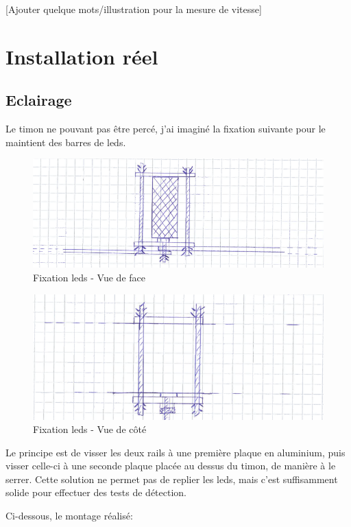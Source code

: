 [Ajouter quelque mots/illustration pour la mesure de vitesse]
\section{Installation réel}
\subsection{Eclairage}
Le timon ne pouvant pas être percé, j'ai imaginé la fixation suivante pour le maintient des barres de leds.

\begin{figure}[H]
    \centering
    \includegraphics[width=13cm]{assets/figures/fixation_eclairage_face.PNG}
    \caption{Fixation leds - Vue de face}
\end{figure}

\begin{figure}[H]
    \centering
    \includegraphics[width=13cm]{assets/figures/fixation_eclairage_cote.PNG}
    \caption{Fixation leds - Vue de côté}
\end{figure}

Le principe est de visser les deux rails à une première plaque en aluminium, puis visser celle-ci à une seconde plaque placée au dessus du timon,
de manière à le serrer. Cette solution ne permet pas de replier les leds, mais c'est suffisamment solide pour effectuer des tests de détection.

Ci-dessous, le montage réalisé:

